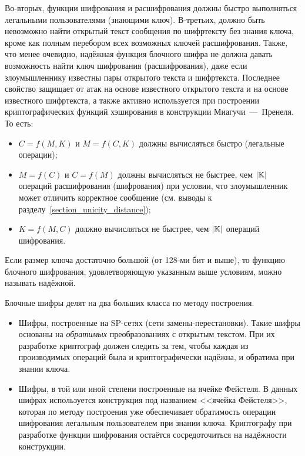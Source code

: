 Во-вторых, функции шифрования и расшифрования должны быстро выполняться легальными пользователями (знающими ключ). В-третьих, должно быть невозможно найти открытый текст сообщения по шифртексту без знания ключа, кроме как полным перебором всех возможных ключей расшифрования. Также, что менее очевидно, надёжная функция блочного шифра не должна давать возможность найти ключ шифрования (расшифрования), даже если злоумышленнику известны пары открытого текста и шифртекста. Последнее свойство защищает от атак на основе известного открытого текста и на основе известного шифртекста, а также активно используется при построении криптографических функций хэширования в конструкции Миагучи~---~Пренеля. То есть:
\begin{itemize}
	\item $C = f \left( M, K \right)$ и $M = f \left( C, K \right)$ должны вычисляться быстро (легальные операции);
	\item $M = f \left( C \right)$ и $C = f \left( M \right)$ должны вычисляться не быстрее, чем $\left| \mathbb{K} \right|$ операций расшифрования (шифрования) при условии, что злоумышленник может отличить корректное сообщение (см. выводы к разделу~\ref{section_unicity_distance});
	\item $K = f \left( M, C \right)$ должно вычисляться не быстрее, чем $\left| \mathbb{K} \right|$ операций шифрования.
\end{itemize}

Если размер ключа достаточно большой (от 128-ми бит и выше), то функцию блочного шифрования, удовлетворяющую указанным выше условиям, можно называть надёжной.

Блочные шифры делят на два больших класса по методу построения.
\begin{itemize}
	\item Шифры, построенные на SP-сетях (сети замены-пере\-становки). Такие шифры основаны на \emph{обратимых} преобразованиях с открытым текстом. При их разработке криптограф должен следить за тем, чтобы каждая из производимых операций была и криптографически надёжна, и обратима при знании ключа.
	\item Шифры, в той или иной степени построенные на ячейке Фейстеля. В данных шифрах используется конструкция под названием <<ячейка Фейстеля>>, которая по методу построения уже обеспечивает обратимость операции шифрования легальным пользователем при знании ключа. Криптографу при разработке функции шифрования остаётся сосредоточиться на надёжности конструкции.
\end{itemize}

